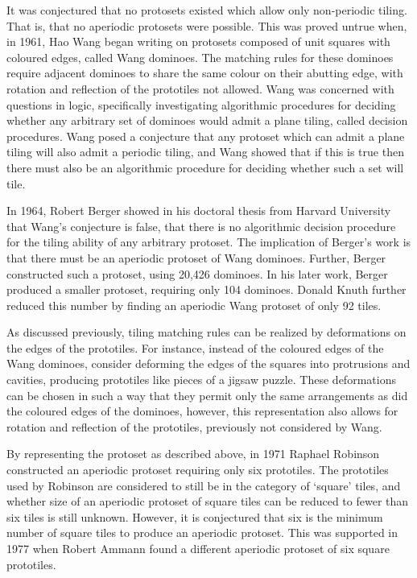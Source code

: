 \documentclass[
  oneside,
  11pt, a4paper,
  footinclude=true,
  headinclude=true,
  cleardoublepage=empty
]{scrbook}
\begin{document}
It was conjectured that no protosets existed which allow only non-periodic tiling. That is, that no aperiodic protosets were possible. This was proved untrue when, in 1961, Hao Wang began writing on protosets composed of unit squares with coloured edges, called Wang dominoes. The matching rules for these dominoes require adjacent dominoes to share the same colour on their abutting edge, with rotation and reflection of the prototiles not allowed. Wang was concerned with questions in logic, specifically investigating algorithmic procedures for deciding whether any arbitrary set of dominoes would admit a plane tiling, called decision procedures. Wang posed a conjecture that any protoset which can admit a plane tiling will also admit a periodic tiling, and Wang showed that if this is true then there must also be an algorithmic procedure for deciding whether such a set will tile. 

In 1964, Robert Berger showed in his doctoral thesis from Harvard University that Wang's conjecture is false, that there is no algorithmic decision procedure for the tiling ability of any arbitrary protoset. The implication of Berger's work is that there must be an aperiodic protoset of Wang dominoes. Further, Berger constructed such a protoset, using 20,426 dominoes. In his later work, Berger produced a smaller protoset, requiring only 104 dominoes. Donald Knuth further reduced this number by finding an aperiodic Wang protoset of only 92 tiles.

As discussed previously, tiling matching rules can be realized by deformations on the edges of the prototiles. For instance, instead of the coloured edges of the Wang dominoes, consider deforming the edges of the squares into protrusions and cavities, producing prototiles like pieces of a jigsaw puzzle. These deformations can be chosen in such a way that they permit only the same arrangements as did the coloured edges of the dominoes, however, this representation also allows for rotation and reflection of the prototiles, previously not considered by Wang. 

By representing the protoset as described above, in 1971 Raphael Robinson constructed an aperiodic protoset requiring only six prototiles. The prototiles used by Robinson are considered to still be in the category of `square' tiles, and whether size of an aperiodic protoset of square tiles can be reduced to fewer than six tiles is still unknown. However, it is conjectured that six is the minimum number of square tiles to produce an aperiodic protoset. This was supported in 1977 when Robert Ammann found a different aperiodic protoset of six square prototiles.
\end{document}
